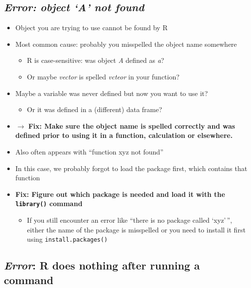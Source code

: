 \documentclass[
]{book}
\providecommand{\tightlist}{%
  \setlength{\itemsep}{0pt}\setlength{\parskip}{0pt}}
\begin{document}
\subsection{\texorpdfstring{\emph{Error: object `A' not found}}{Error: object `A' not found}}\label{error-object-a-not-found}

\begin{itemize}
\item
  Object you are trying to use cannot be found by R
\item
  Most common cause: probably you misspelled the object name somewhere

  \begin{itemize}
  \tightlist
  \item
    R is case-sensitive: was object \emph{A} defined as \emph{a}?
  \item
    Or maybe \emph{vector} is spelled \emph{vcteor} in your function?
  \end{itemize}
\item
  Maybe a variable was never defined but now you want to use it?

  \begin{itemize}
  \tightlist
  \item
    Or it was defined in a (different) data frame?
  \end{itemize}
\item
  \(\rightarrow\) \textbf{Fix: Make sure the object name is spelled correctly and was defined prior to using it in a function, calculation or elsewhere.}
\item
  Also often appears with ``function xyz not found''
\item
  In this case, we probably forgot to load the package first, which contains that function
\item
  \textbf{Fix: Figure out which package is needed and load it with the \texttt{library()} command}

  \begin{itemize}
  \tightlist
  \item
    If you still encounter an error like ``there is no package called `xyz'\,'', either the name of the package is misspelled or you need to install it first using \texttt{install.packages()}
  \end{itemize}
\end{itemize}

\subsection{\texorpdfstring{\emph{Error}: R does nothing after running a command}{Error: R does nothing after running a command}}\label{error-r-does-nothing-after-running-a-command}
\end{document}
